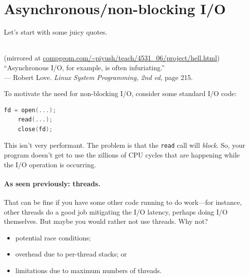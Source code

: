 




\section*{Asynchronous/non-blocking I/O}

Let's start with some juicy quotes.

\begin{center}
  \\
{\scriptsize (mirrored at \url{compgeom.com/~piyush/teach/4531_06/project/hell.html})}
   \\[2em]

   ``Asynchronous I/O, for example, is often infuriating.''\\
\hfill --- Robert Love. {\em Linux System Programming, 2nd ed, } page 215.

\end{center}

To motivate the need for non-blocking I/O, consider some standard I/O code:

\begin{lstlisting}[language=C]
    fd = open(...);
    read(...);
    close(fd);
\end{lstlisting}

This isn't very performant. The problem is that the {\tt read} call will
{\em block}. So, your program doesn't get to use the zillions of CPU cycles that
are happening while the I/O operation is occurring.

\paragraph{As seen previously: threads.} That can be fine if
you have some other code running to do work---for instance, other threads
do a good job mitigating the I/O latency, perhaps doing I/O themselves.
But maybe you would rather not use threads. Why not?

\begin{itemize}
\item potential race conditions;
\item overhead due to per-thread stacks; or
\item limitations due to maximum numbers of threads.
\end{itemize}


